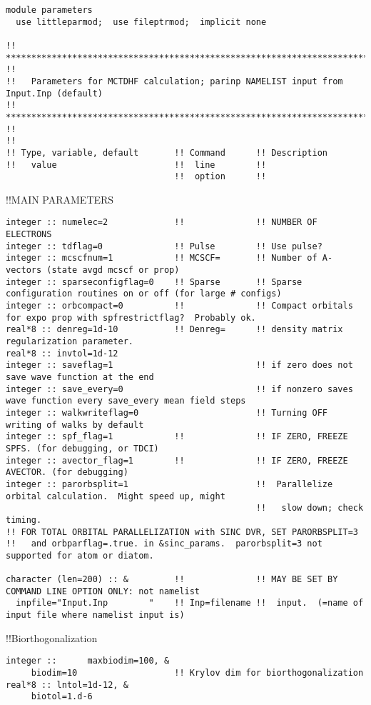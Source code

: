 \begin{verbatim}
module parameters
  use littleparmod;  use fileptrmod;  implicit none

!! *********************************************************************************************************** !!
!!   Parameters for MCTDHF calculation; parinp NAMELIST input from Input.Inp (default)
!! *********************************************************************************************************** !!
!!
!! Type, variable, default       !! Command      !! Description 
!!   value                       !!  line        !! 
                                 !!  option      !!
\end{verbatim}
!!{\large \quad MAIN PARAMETERS }
\begin{verbatim}
integer :: numelec=2             !!              !! NUMBER OF ELECTRONS
integer :: tdflag=0              !! Pulse        !! Use pulse?
integer :: mcscfnum=1            !! MCSCF=       !! Number of A-vectors (state avgd mcscf or prop)
integer :: sparseconfigflag=0    !! Sparse       !! Sparse configuration routines on or off (for large # configs)
integer :: orbcompact=0          !!              !! Compact orbitals for expo prop with spfrestrictflag?  Probably ok.
real*8 :: denreg=1d-10           !! Denreg=      !! density matrix regularization parameter.
real*8 :: invtol=1d-12
integer :: saveflag=1                            !! if zero does not save wave function at the end
integer :: save_every=0                          !! if nonzero saves wave function every save_every mean field steps
integer :: walkwriteflag=0                       !! Turning OFF writing of walks by default
integer :: spf_flag=1            !!              !! IF ZERO, FREEZE SPFS. (for debugging, or TDCI)
integer :: avector_flag=1        !!              !! IF ZERO, FREEZE AVECTOR. (for debugging)
integer :: parorbsplit=1                         !!  Parallelize orbital calculation.  Might speed up, might
                                                 !!   slow down; check timing.
!! FOR TOTAL ORBITAL PARALLELIZATION with SINC DVR, SET PARORBSPLIT=3
!!   and orbparflag=.true. in &sinc_params.  parorbsplit=3 not supported for atom or diatom.

character (len=200) :: &         !!              !! MAY BE SET BY COMMAND LINE OPTION ONLY: not namelist
  inpfile="Input.Inp        "    !! Inp=filename !!  input.  (=name of input file where namelist input is)
\end{verbatim}
!!{\large \quad Biorthogonalization }
\begin{verbatim}
integer ::      maxbiodim=100, &
     biodim=10                   !! Krylov dim for biorthogonalization
real*8 :: lntol=1d-12, &
     biotol=1.d-6
\end{verbatim}
